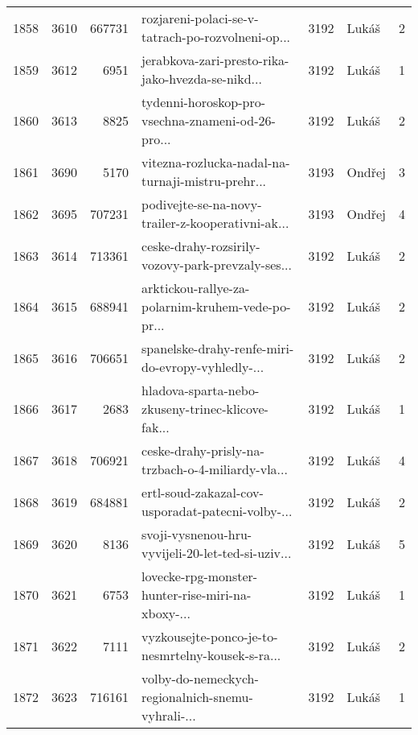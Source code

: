 \begin{tabular}{lrrlrlr}
1858 &       3610 &   667731 &  rozjareni-polaci-se-v-tatrach-po-rozvolneni-op... &     3192 &                        Lukáš &               2 \\
1859 &       3612 &     6951 &  jerabkova-zari-presto-rika-jako-hvezda-se-nikd... &     3192 &                        Lukáš &               1 \\
1860 &       3613 &     8825 &  tydenni-horoskop-pro-vsechna-znameni-od-26-pro... &     3192 &                        Lukáš &               2 \\
1861 &       3690 &     5170 &  vitezna-rozlucka-nadal-na-turnaji-mistru-prehr... &     3193 &                       Ondřej &               3 \\
1862 &       3695 &   707231 &  podivejte-se-na-novy-trailer-z-kooperativni-ak... &     3193 &                       Ondřej &               4 \\
1863 &       3614 &   713361 &  ceske-drahy-rozsirily-vozovy-park-prevzaly-ses... &     3192 &                        Lukáš &               2 \\
1864 &       3615 &   688941 &  arktickou-rallye-za-polarnim-kruhem-vede-po-pr... &     3192 &                        Lukáš &               2 \\
1865 &       3616 &   706651 &  spanelske-drahy-renfe-miri-do-evropy-vyhledly-... &     3192 &                        Lukáš &               2 \\
1866 &       3617 &     2683 &  hladova-sparta-nebo-zkuseny-trinec-klicove-fak... &     3192 &                        Lukáš &               1 \\
1867 &       3618 &   706921 &  ceske-drahy-prisly-na-trzbach-o-4-miliardy-vla... &     3192 &                        Lukáš &               4 \\
1868 &       3619 &   684881 &  ertl-soud-zakazal-cov-usporadat-patecni-volby-... &     3192 &                        Lukáš &               2 \\
1869 &       3620 &     8136 &  svoji-vysnenou-hru-vyvijeli-20-let-ted-si-uziv... &     3192 &                        Lukáš &               5 \\
1870 &       3621 &     6753 &  lovecke-rpg-monster-hunter-rise-miri-na-xboxy-... &     3192 &                        Lukáš &               1 \\
1871 &       3622 &     7111 &  vyzkousejte-ponco-je-to-nesmrtelny-kousek-s-ra... &     3192 &                        Lukáš &               2 \\
1872 &       3623 &   716161 &  volby-do-nemeckych-regionalnich-snemu-vyhrali-... &     3192 &                        Lukáš &               1 \\

\end{tabular}

